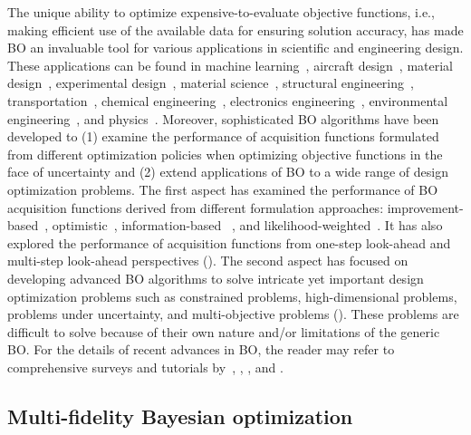 \documentclass[journal ]{new-aiaa}
\begin{document}
The unique ability to optimize expensive-to-evaluate objective functions, i.e., making efficient use of the available data for ensuring solution accuracy, has made BO an invaluable tool for various applications in scientific and engineering design.
These applications can be found in machine learning~\citep{Bergstra2011}, aircraft design~\citep{Priem2020}, material design~\citep{Tran2019,Khatamsaz2021md}, experimental design~\citep{Greenhill2020}, material science~\citep{Ueno2016}, structural engineering~\citep{Mathern2021}, transportation~\citep{ShiR2021}, chemical engineering~\citep{Park2018}, electronics engineering~\citep{Torun2018}, environmental engineering~\citep{Manheim2019}, and  physics~\citep{Roussel2021}.
Moreover, sophisticated BO algorithms have been developed to
(1) examine the performance of acquisition functions formulated from different optimization policies
when optimizing objective functions in the face of uncertainty and
(2) extend applications of BO to a wide range of design optimization problems.
The first aspect has examined the performance of BO acquisition functions derived from different formulation approaches: improvement-based~\citep{Jones2001}, optimistic~\citep{Srinivas2010}, information-based ~\citep{Hennig2012}, and likelihood-weighted~\citep{Blanchard2021jcp}.
It has also explored the performance of acquisition functions from one-step look-ahead and multi-step look-ahead perspectives ().
The second aspect has focused on developing advanced BO algorithms to solve intricate yet important design optimization problems such as constrained problems, high-dimensional problems, problems under uncertainty, and multi-objective problems ().
These problems are difficult to solve because of their own nature and/or limitations of the generic BO.
For the details of recent advances in BO, the reader may refer to comprehensive surveys and tutorials by~\citet{Brochu2010}, \citet{Shahriari2016}, \citet{Frazier2018}, and \citet{Wang2023}.

\subsection{Multi-fidelity Bayesian optimization}\label{Sec33}
\end{document}
